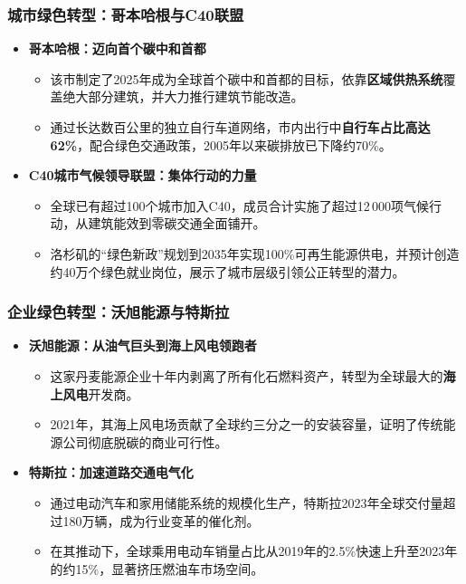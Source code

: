 \documentclass[11pt]{beamer}
\begin{document}
\begin{frame}\frametitle{城市绿色转型：哥本哈根与C40联盟}
\begin{itemize}
    \item \textbf{哥本哈根：迈向首个碳中和首都}
    \begin{itemize}
        \item 该市制定了2025年成为全球首个碳中和首都的目标，依靠\textbf{区域供热系统}覆盖绝大部分建筑，并大力推行建筑节能改造。
        \item 通过长达数百公里的独立自行车道网络，市内出行中\textbf{自行车占比高达62\%}，配合绿色交通政策，2005年以来碳排放已下降约70\%。
    \end{itemize}
    \vspace{0.2cm}
    \item \textbf{C40城市气候领导联盟：集体行动的力量}
    \begin{itemize}
        \item 全球已有超过100个城市加入C40，成员合计实施了超过12\,000项气候行动，从建筑能效到零碳交通全面铺开。
        \item \alert{洛杉矶的“绿色新政”}规划到2035年实现100\%可再生能源供电，并预计创造约40万个绿色就业岗位，展示了城市层级引领公正转型的潜力。
    \end{itemize}
\end{itemize}
\end{frame}

\begin{frame}\frametitle{企业绿色转型：沃旭能源与特斯拉}
\begin{itemize}
    \item \textbf{沃旭能源：从油气巨头到海上风电领跑者}
    \begin{itemize}
        \item 这家丹麦能源企业十年内剥离了所有化石燃料资产，转型为全球最大的\textbf{海上风电}开发商。
        \item 2021年，其海上风电场贡献了全球约三分之一的安装容量，证明了传统能源公司彻底脱碳的商业可行性。
    \end{itemize}
    \vspace{0.2cm}
    \item \textbf{特斯拉：加速道路交通电气化}
    \begin{itemize}
        \item 通过电动汽车和家用储能系统的规模化生产，特斯拉2023年全球交付量超过180万辆，成为行业变革的催化剂。
        \item 在其推动下，全球乘用电动车销量占比从2019年的2.5\%快速上升至2023年的约15\%，显著挤压燃油车市场空间。
    \end{itemize}
\end{itemize}
\end{frame}
\end{document}
